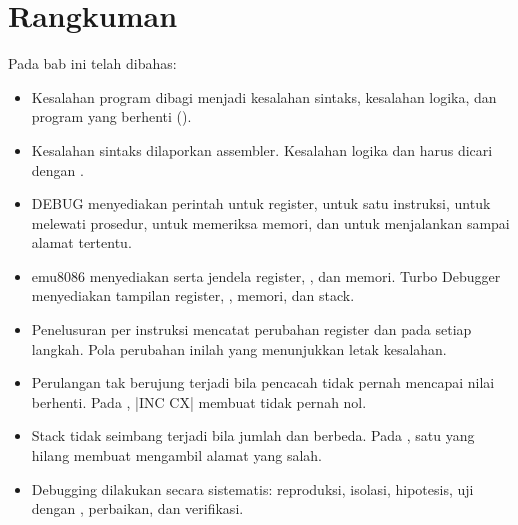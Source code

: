 \section{Rangkuman}
\label{sec:rangkuman-bab16}

Pada bab ini telah dibahas:

\begin{itemize}
    \item Kesalahan program dibagi menjadi kesalahan sintaks,
          kesalahan logika, dan program yang berhenti
          ().

    \item Kesalahan sintaks dilaporkan assembler. Kesalahan logika
          dan  harus dicari dengan .

    \item DEBUG menyediakan perintah  untuk register,
           untuk satu instruksi,  untuk melewati
          prosedur,  untuk memeriksa memori, dan 
          untuk menjalankan sampai alamat tertentu.

    \item emu8086 menyediakan  serta jendela
          register, , dan memori. Turbo Debugger
          menyediakan tampilan register, , memori, dan
          stack.

    \item Penelusuran per instruksi mencatat perubahan register dan
           pada setiap langkah. Pola perubahan inilah yang
          menunjukkan letak kesalahan.

    \item Perulangan tak berujung terjadi bila pencacah tidak pernah
          mencapai nilai berhenti. Pada ,
          \lstasm|INC CX| membuat  tidak pernah nol.

    \item Stack tidak seimbang terjadi bila jumlah  dan
           berbeda. Pada , satu
           yang hilang membuat  mengambil alamat
          yang salah.

    \item Debugging dilakukan secara sistematis: reproduksi,
          isolasi, hipotesis, uji dengan , perbaikan, dan
          verifikasi.
\end{itemize}

